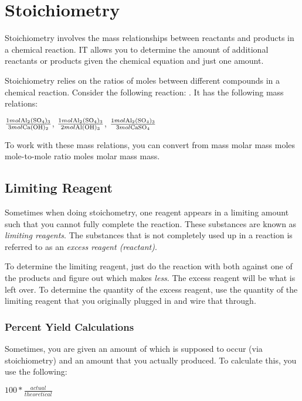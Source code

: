 \section{Stoichiometry}
Stoichiometry involves the mass relationships between reactants and products in
a chemical reaction.  IT allows you to determine the amount of additional
reactants or products given the chemical equation and just one amount.

Stoichiometry relies on the ratios of moles between different compounds in a
chemical reaction.  Consider the following reaction: .  It has the following mass relations:

\begin{frame}
  \centering
  {\huge $\frac{1mol \ce{Al2(SO4)3}}{3mol \ce{Ca(OH)2}}$, $\frac{1mol
  \ce{Al2(SO4)3}}{2mol \ce{Al(OH)3}}$, $\frac{1mol \ce{Al2(SO4)3}}{3mol
  \ce{CaSO4}}$}
\end{frame}

To work with these mass relations, you can convert from mass \leftarrow molar
mass \leftarrow moles \leftarrow mole-to-mole ratio \leftarrow moles \leftarrow
molar mass \leftarrow mass.

\subsection{Limiting Reagent}
Sometimes when doing stoichometry, one reagent appears in a limiting amount such
that you cannot fully complete the reaction.  These substances are known as
\textit{limiting reagents}.  The substances that is not completely used up in a
reaction is referred to as an \textit{excess reagent (reactant)}.

To determine the limiting reagent, just do the reaction with both against one of
the products and figure out which makes \textit{less}.  The excess reagent will
be what is left over.  To determine the quantity of the excess reagent, use the
quantity of the limiting reagent that you originally plugged in and wire that
through.

\subsubsection{Percent Yield Calculations}
Sometimes, you are given an amount of which is supposed to occur (via
stoichiometry) and an amount that you actually produced.  To calculate this, you
use the following:

{\huge $100 * \frac{actual}{theoretical}$}
